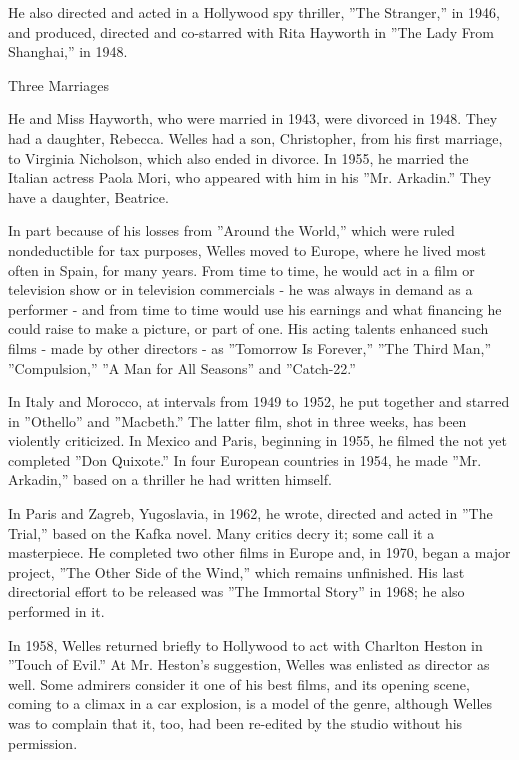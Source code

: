 He also directed and acted in a Hollywood spy thriller, ''The
Stranger,'' in 1946, and produced, directed and co-starred with Rita
Hayworth in ''The Lady From Shanghai,'' in 1948.

Three Marriages

He and Miss Hayworth, who were married in 1943, were divorced in 1948.
They had a daughter, Rebecca. Welles had a son, Christopher, from his
first marriage, to Virginia Nicholson, which also ended in divorce. In
1955, he married the Italian actress Paola Mori, who appeared with him
in his ''Mr. Arkadin.'' They have a daughter, Beatrice.

In part because of his losses from ''Around the World,'' which were
ruled nondeductible for tax purposes, Welles moved to Europe, where he
lived most often in Spain, for many years. From time to time, he would
act in a film or television show or in television commercials - he was
always in demand as a performer - and from time to time would use his
earnings and what financing he could raise to make a picture, or part of
one. His acting talents enhanced such films - made by other directors -
as ''Tomorrow Is Forever,'' ''The Third Man,'' ''Compulsion,'' ''A Man
for All Seasons'' and ''Catch-22.''

In Italy and Morocco, at intervals from 1949 to 1952, he put together
and starred in ''Othello'' and ''Macbeth.'' The latter film, shot in
three weeks, has been violently criticized. In Mexico and Paris,
beginning in 1955, he filmed the not yet completed ''Don Quixote.'' In
four European countries in 1954, he made ''Mr. Arkadin,'' based on a
thriller he had written himself.

In Paris and Zagreb, Yugoslavia, in 1962, he wrote, directed and acted
in ''The Trial,'' based on the Kafka novel. Many critics decry it; some
call it a masterpiece. He completed two other films in Europe and, in
1970, began a major project, ''The Other Side of the Wind,'' which
remains unfinished. His last directorial effort to be released was ''The
Immortal Story'' in 1968; he also performed in it.

In 1958, Welles returned briefly to Hollywood to act with Charlton
Heston in ''Touch of Evil.'' At Mr. Heston's suggestion, Welles was
enlisted as director as well. Some admirers consider it one of his best
films, and its opening scene, coming to a climax in a car explosion, is
a model of the genre, although Welles was to complain that it, too, had
been re-edited by the studio without his permission.

